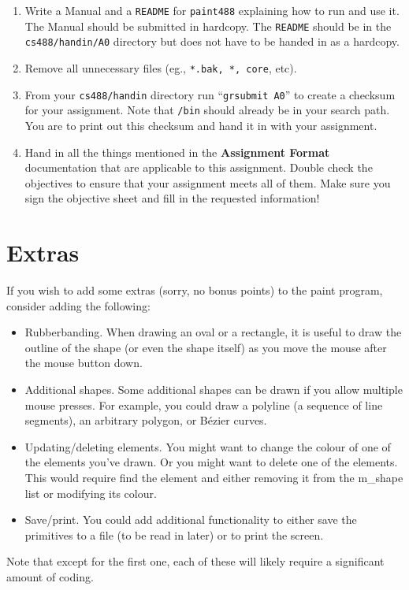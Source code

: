 \begin{enumerate}
        \item
                Write a Manual and a \texttt{README} for \texttt{paint488} 
                explaining how to run and use it.  
                The Manual should be submitted in hardcopy.
                The \texttt{README} should be in the \texttt{cs488/handin/A0} 
                directory but does not have to be handed in as a hardcopy.  
        \item
                Remove all unnecessary files (eg., 
                        \texttt{*.bak, *{}, core}, etc).

    \item
        From your \texttt{cs488/handin} directory
        run ``\texttt{grsubmit A0}'' to create a checksum
        for your assignment.   Note that \texttt{\CourseData/bin} should
        already be in your search path.
        You are to print out this checksum and
        hand it in with your assignment.

    \item
        Hand in all the things mentioned in the {\bf Assignment Format} 
        documentation that are applicable to this assignment.  Double
        check the objectives to ensure that your assignment meets all of them.
        Make sure you sign the objective sheet and fill in the requested 
        information!

\end{enumerate}

\section{Extras}
If you wish to add some extras (sorry, no bonus points) to the
paint program, consider adding the following:
\begin{itemize}
	\item Rubberbanding.  When drawing an oval or a rectangle,
		it is useful to draw the outline of the shape (or
		even the shape itself) as you move the mouse after
		the mouse button down.
	\item Additional shapes.  Some additional shapes can be
		drawn if you allow multiple mouse presses.
		For example, you could draw a polyline (a sequence
		of line segments), an arbitrary polygon, or B\'ezier
		curves.
	\item Updating/deleting elements.  You might want to change
		the colour of one of the elements you've drawn.  Or
		you might want to delete one of the elements.  This
		would require find the element and either removing
		it from the m\_shape list or modifying its colour.
	\item Save/print.  You could add additional functionality
		to either save the primitives to a file (to be
		read in later) or to print the screen.
\end{itemize}
Note that except for the first one, each of these will likely require
a significant amount of coding.

